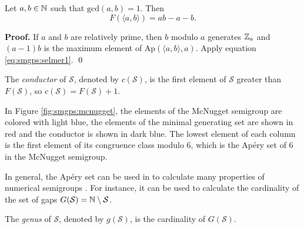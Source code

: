 \begin{theorem} Let $a, b \in \mathbb{N}$ such that $\mathrm{gcd}(a, b) = 1$. Then 
    \[F(\langle a, b \rangle) = ab - a - b.\] 
\end{theorem}
\textbf{Proof. } If $a$ and $b$ are relatively prime, then $b$ modulo $a$ generates $\mathbb{Z}_a$ and $(a - 1)b$ is the maximum element of $\mathrm{Ap}(\langle a, b\rangle, a)$. Apply equation \ref{eq:smgps:selmer1}. \qed

\begin{definition}
    The \textit{conductor} of $\mathcal{S}$, denoted by $c(\mathcal{S})$, is the first element of $\mathcal{S}$ greater than $F(\mathcal{S})$, so $c(\mathcal{S}) = F(\mathcal{S}) + 1$.
\end{definition}
In Figure \ref{fig:smgps:mcnugget}, the elements of the McNugget semigroup are colored with light blue, the elements of the minimal generating set are shown in red and the conductor is shown in dark blue. The lowest element of each column is the first element of its congruence class modulo 6, which is the Apéry set of 6 in the McNugget semigroup. \par

In general, the Apéry set can be used in to calculate many properties of numerical semigroups \cite{apery1946branches}. For instance, it can be used to calculate the cardinality of the set of gaps $G(\mathcal{S}) = \mathbb{N} \setminus \mathcal{S}$.

\begin{definition}\label{def:smgps:genus}
    The \textit{genus} of $\mathcal{S}$, denoted by $g(\mathcal{S})$, is the cardinality of $G(\mathcal{S})$.
\end{definition}

